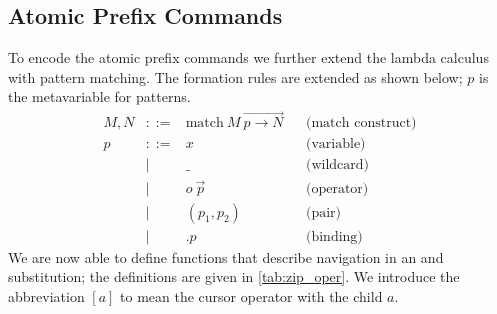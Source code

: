 \documentclass[sigplan,screen]{acmart}
\begin{document}

\subsection{Atomic Prefix Commands}

To encode the atomic prefix commands we further extend the lambda
calculus with pattern matching. The formation rules are extended as
shown below; $p$ is the metavariable for patterns.
\begin{align*}
    M, N & ::= & \text{match}\ M\ \overrightarrow{p \to N} && \text{(match construct)}
    \\
    p & ::= & x              & & \text{(variable)} \\
      & |   & \_             && \text{(wildcard)} \\
      & |   & o\ \Vec{p}     && \text{(operator)} \\
      & |   & (p_1, p_2)     && \text{(pair)} \\
         & |   & .p             && \text{(binding)}
\end{align*}
%
We are now able to define functions that describe navigation in an
\abt and substitution; the definitions are given in
\cref{tab:zip_oper}. We introduce the abbreviation $[a]$ to mean the
cursor operator with the child $a$.
\end{document}
